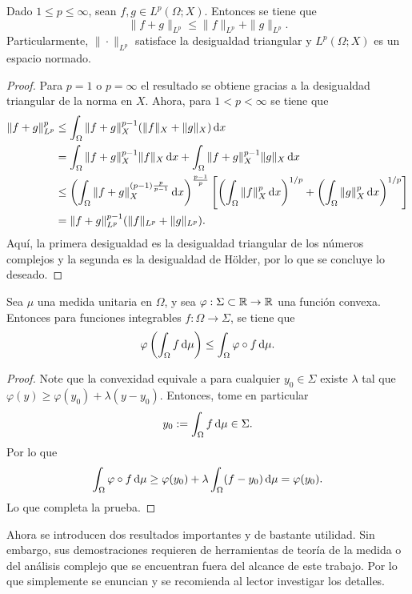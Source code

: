 \begin{proposition}
    Dado $1\leq p\leq\infty$, sean $f,g\in L^p(\Omega;X)$. Entonces se tiene que
    \begin{equation*}
        \|f+g\|_{L^p} \leq \|f\|_{L^p} +
        \|g\|_{L^p}.
    \end{equation*}
    Particularmente, $\|\cdot\|_{L^p}$ satisface la desigualdad triangular
    y $L^p(\Omega;X)$ es un espacio normado.
\end{proposition}
\begin{proof}
    Para $p=1$ o $p=\infty$ el resultado se obtiene gracias a la desigualdad
    triangular de la norma en $X$. Ahora, para $1<p<\infty$ 
    se tiene que
    \begin{align*}
        \|f+g\|_{L^p}^p & \leq \int_\Omega \|f+g\|_X^{p-1}(\|f\|_X+\|g\|_X)\mathop{}\!\mathrm{d} x\\
        & = \int_\Omega \|f+g\|_X^{p-1}\|f\|_X \mathop{}\!\mathrm{d} x + 
        \int_\Omega \|f+g\|_X^{p-1}\|g\|_X \mathop{}\!\mathrm{d} x \\
        & \leq \left( 
            \int_\Omega \|f+g\|_X^{(p-1) \frac{p}{p-1}} \mathop{}\!\mathrm{d} x 
        \right)^{\frac{p-1}{p}} \left[
            \left(\int_\Omega \|f\|_X^p\mathop{}\!\mathrm{d} x\right)^{1/p} +
            \left(\int_\Omega \|g\|_X^p\mathop{}\!\mathrm{d} x\right)^{1/p}
        \right] \\ 
        & = \|f+g\|_{L^p}^{p-1}(\|f\|_{L^p} + \|g\|_{L^p}).
    \end{align*}
    Aquí, la primera desigualdad es la desigualdad triangular de los números
    complejos y la segunda es la desigualdad de H\"older, por lo que se concluye
    lo deseado.
\end{proof}
\begin{theorem}
	Sea $\mu$ una medida unitaria en $\Omega$, y sea $\varphi:\Sigma\subset\mathbb{R}\to\mathbb{R}$ una función convexa. Entonces para funciones integrables  $f:\Omega\to\Sigma$, se tiene que 
	\begin{equation*}
		\varphi \left(\int_\Omega f\mathop{}\!\mathrm{d}\mu  \right) \leq \int_\Omega \varphi\circ f\mathop{}\!\mathrm{d}\mu.
	\end{equation*}
\end{theorem}
\begin{proof}
	Note que la convexidad equivale a para cualquier $y_0\in\Sigma$ existe $\lambda$ tal que $\varphi(y) \geq \varphi(y_0) + \lambda(y-y_0)$. Entonces, tome en particular
	\begin{equation*}
		y_0 := \int_\Omega f\mathop{}\!\mathrm{d}\mu \in \Sigma.
	\end{equation*}
	Por lo que 
	\begin{equation*}
		\int_\Omega \varphi\circ f\mathop{}\!\mathrm{d} \mu \geq \varphi(y_0) + \lambda \int_\Omega (f-y_0)\mathop{}\!\mathrm{d} \mu = \varphi(y_0).
	\end{equation*}
	Lo que completa la prueba.
\end{proof}
Ahora se introducen dos resultados importantes y de bastante utilidad. Sin embargo,
sus demostraciones requieren de herramientas de teoría de la medida o del 
análisis complejo que se encuentran fuera del alcance de este trabajo. Por lo que
simplemente se enuncian y se recomienda al lector investigar los detalles.

